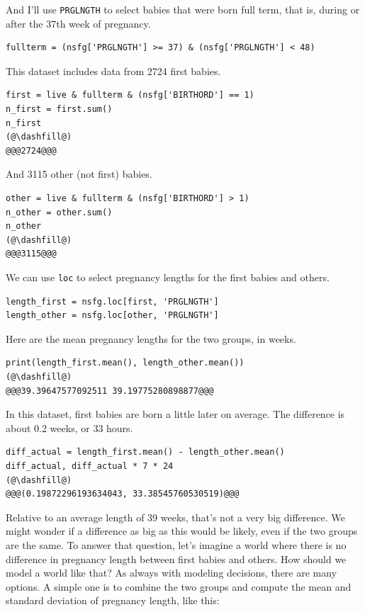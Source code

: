 And I'll use \passthrough{\lstinline!PRGLNGTH!} to select babies that
were born full term, that is, during or after the 37th week of
pregnancy.

\begin{lstlisting}[]
fullterm = (nsfg['PRGLNGTH'] >= 37) & (nsfg['PRGLNGTH'] < 48)
\end{lstlisting}

This dataset includes data from 2724 first babies.

\begin{lstlisting}[]
first = live & fullterm & (nsfg['BIRTHORD'] == 1)
n_first = first.sum()
n_first
(@\dashfill@)
@@@2724@@@
\end{lstlisting}

And 3115 other (not first) babies.

\begin{lstlisting}[]
other = live & fullterm & (nsfg['BIRTHORD'] > 1)
n_other = other.sum()
n_other
(@\dashfill@)
@@@3115@@@
\end{lstlisting}

We can use \passthrough{\lstinline!loc!} to select pregnancy lengths for
the first babies and others.

\begin{lstlisting}[]
length_first = nsfg.loc[first, 'PRGLNGTH']
length_other = nsfg.loc[other, 'PRGLNGTH']
\end{lstlisting}

Here are the mean pregnancy lengths for the two groups, in weeks.

\begin{lstlisting}[]
print(length_first.mean(), length_other.mean())
(@\dashfill@)
@@@39.39647577092511 39.19775280898877@@@
\end{lstlisting}

In this dataset, first babies are born a little later on average. The
difference is about 0.2 weeks, or 33 hours.

\begin{lstlisting}[]
diff_actual = length_first.mean() - length_other.mean()
diff_actual, diff_actual * 7 * 24
(@\dashfill@)
@@@(0.19872296193634043, 33.38545760530519)@@@
\end{lstlisting}

Relative to an average length of 39 weeks, that's not a very big
difference. We might wonder if a difference as big as this would be
likely, even if the two groups are the same. To answer that question,
let's imagine a world where there is no difference in pregnancy length
between first babies and others. How should we model a world like that?
As always with modeling decisions, there are many options. A simple one
is to combine the two groups and compute the mean and standard deviation
of pregnancy length, like this:

